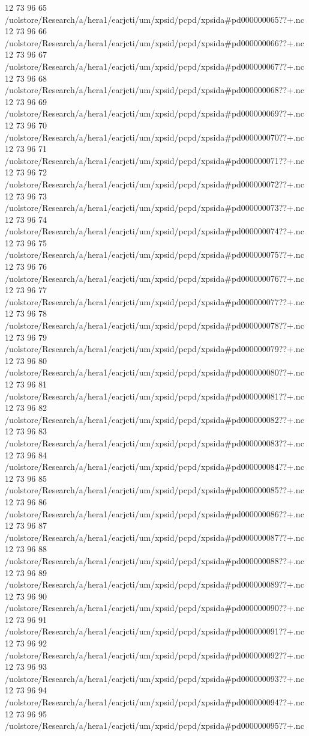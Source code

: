 12 73 96
65
/uolstore/Research/a/hera1/earjcti/um/xpsid/pcpd/xpsida#pd000000065??+.nc
12 73 96
66
/uolstore/Research/a/hera1/earjcti/um/xpsid/pcpd/xpsida#pd000000066??+.nc
12 73 96
67
/uolstore/Research/a/hera1/earjcti/um/xpsid/pcpd/xpsida#pd000000067??+.nc
12 73 96
68
/uolstore/Research/a/hera1/earjcti/um/xpsid/pcpd/xpsida#pd000000068??+.nc
12 73 96
69
/uolstore/Research/a/hera1/earjcti/um/xpsid/pcpd/xpsida#pd000000069??+.nc
12 73 96
70
/uolstore/Research/a/hera1/earjcti/um/xpsid/pcpd/xpsida#pd000000070??+.nc
12 73 96
71
/uolstore/Research/a/hera1/earjcti/um/xpsid/pcpd/xpsida#pd000000071??+.nc
12 73 96
72
/uolstore/Research/a/hera1/earjcti/um/xpsid/pcpd/xpsida#pd000000072??+.nc
12 73 96
73
/uolstore/Research/a/hera1/earjcti/um/xpsid/pcpd/xpsida#pd000000073??+.nc
12 73 96
74
/uolstore/Research/a/hera1/earjcti/um/xpsid/pcpd/xpsida#pd000000074??+.nc
12 73 96
75
/uolstore/Research/a/hera1/earjcti/um/xpsid/pcpd/xpsida#pd000000075??+.nc
12 73 96
76
/uolstore/Research/a/hera1/earjcti/um/xpsid/pcpd/xpsida#pd000000076??+.nc
12 73 96
77
/uolstore/Research/a/hera1/earjcti/um/xpsid/pcpd/xpsida#pd000000077??+.nc
12 73 96
78
/uolstore/Research/a/hera1/earjcti/um/xpsid/pcpd/xpsida#pd000000078??+.nc
12 73 96
79
/uolstore/Research/a/hera1/earjcti/um/xpsid/pcpd/xpsida#pd000000079??+.nc
12 73 96
80
/uolstore/Research/a/hera1/earjcti/um/xpsid/pcpd/xpsida#pd000000080??+.nc
12 73 96
81
/uolstore/Research/a/hera1/earjcti/um/xpsid/pcpd/xpsida#pd000000081??+.nc
12 73 96
82
/uolstore/Research/a/hera1/earjcti/um/xpsid/pcpd/xpsida#pd000000082??+.nc
12 73 96
83
/uolstore/Research/a/hera1/earjcti/um/xpsid/pcpd/xpsida#pd000000083??+.nc
12 73 96
84
/uolstore/Research/a/hera1/earjcti/um/xpsid/pcpd/xpsida#pd000000084??+.nc
12 73 96
85
/uolstore/Research/a/hera1/earjcti/um/xpsid/pcpd/xpsida#pd000000085??+.nc
12 73 96
86
/uolstore/Research/a/hera1/earjcti/um/xpsid/pcpd/xpsida#pd000000086??+.nc
12 73 96
87
/uolstore/Research/a/hera1/earjcti/um/xpsid/pcpd/xpsida#pd000000087??+.nc
12 73 96
88
/uolstore/Research/a/hera1/earjcti/um/xpsid/pcpd/xpsida#pd000000088??+.nc
12 73 96
89
/uolstore/Research/a/hera1/earjcti/um/xpsid/pcpd/xpsida#pd000000089??+.nc
12 73 96
90
/uolstore/Research/a/hera1/earjcti/um/xpsid/pcpd/xpsida#pd000000090??+.nc
12 73 96
91
/uolstore/Research/a/hera1/earjcti/um/xpsid/pcpd/xpsida#pd000000091??+.nc
12 73 96
92
/uolstore/Research/a/hera1/earjcti/um/xpsid/pcpd/xpsida#pd000000092??+.nc
12 73 96
93
/uolstore/Research/a/hera1/earjcti/um/xpsid/pcpd/xpsida#pd000000093??+.nc
12 73 96
94
/uolstore/Research/a/hera1/earjcti/um/xpsid/pcpd/xpsida#pd000000094??+.nc
12 73 96
95
/uolstore/Research/a/hera1/earjcti/um/xpsid/pcpd/xpsida#pd000000095??+.nc
